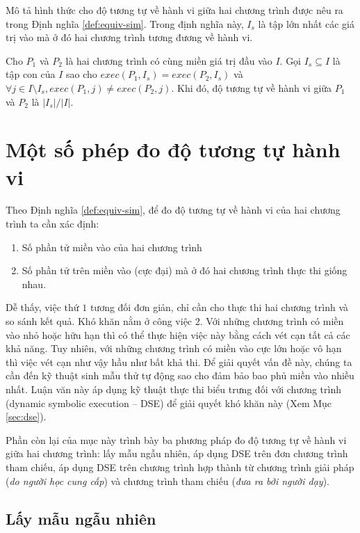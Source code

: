 Mô tả hình thức cho độ tương tự về hành vi giữa hai chương trình được
nêu ra trong Định nghĩa \ref{def:equiv-sim}. Trong định nghĩa này,
$I_s$ là tập lớn nhất các giá trị vào mà ở đó hai chương trình tương
đương về hành vi.
    
\begin{definition}
  \label{def:equiv-sim}
  Cho $P_{1}$ và $P_{2}$ là hai chương trình có cùng miền giá trị đầu
  vào $I$. Gọi $I_{s} \subseteq I$ là tập con của $I$ sao cho
  $exec(P_{1}, I_{s}) = exec(P_{2}, I_{s})$ và
  $\forall j \in I \setminus I_{s}, exec(P_{1}, j) \neq exec(P_{2},
  j)$. Khi đó, độ tương tự về hành vi giữa $P_1$ và $P_2$ là $|I_s|/|I|$.
\end{definition}

\section{Một số phép đo độ tương tự hành vi}
\label{sec:metrics}

Theo Định nghĩa \ref{def:equiv-sim}, để đo độ tương tự về hành vi của
hai chương trình ta cần xác định:
\begin{enumerate}
\item Số phần tử miền vào của hai chương trình
\item Số phần tử trên miền vào (cực đại) mà ở đó hai chương trình thực thi giống nhau.
\end{enumerate}
Dễ thấy, việc thứ $1$ tương đối đơn giản, chỉ cần cho thực thi hai
chương trình và so sánh kết quả. Khó khăn nằm ở công việc $2$. Với
những chương trình có miền vào nhỏ hoặc hữu hạn thì có thể thực hiện
việc này bằng cách vét cạn tất cả các khả năng. Tuy nhiên, với những
chương trình có miền vào cực lớn hoặc vô hạn thì việc vét cạn như vậy
hầu như bất khả thi. Để giải quyết vấn đề này, chúng ta cần đến kỹ
thuật sinh mẫu thử tự động sao cho đảm bảo bao phủ miền vào nhiều
nhất. Luận văn này áp dụng kỹ thuật thực thi biểu trưng đối với chương
trình (dynamic symbolic execution -- DSE) để giải quyết khó khăn này
(Xem Mục \ref{sec:dse}).

Phần còn lại của mục này trình bày ba phương pháp đo độ tương tự về
hành vi giữa hai chương trình: lấy mẫu ngẫu nhiên, áp dụng DSE trên
đơn chương trình tham chiếu, áp dụng DSE trên chương trình hợp thành
từ chương trình giải pháp (\emph{do người học cung cấp}) và chương
trình tham chiếu (\emph{đưa ra bởi người dạy}).

\subsection{Lấy mẫu ngẫu nhiên}


